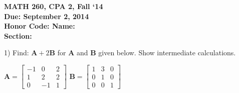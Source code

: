 \documentclass{article}
\begin{document}
\begin{flushleft}
	\bfseries{MATH 260, CPA 2, Fall `14}\\
	\bfseries{Due: September 2, 2014}\\
	\bfseries{Honor Code:} \hspace{3.5in}\bfseries{Name:}\\
	\hspace{4.37in}\bfseries{Section:}
\end{flushleft}
\begin{flushleft}
\vspace{.25in}

1) Find: $\textbf{A} + 2\textbf{B}$ for \textbf{A} and \textbf{B} given below.  Show intermediate calculations.

\vspace{0.2in}

\begin{center}

$\textbf{A}=\left[
\begin{array}{ccc}
-1 & 0 & 2\\
1 & 2 & 2\\
0 & -1 & 1
\end{array}
\right]
$
\hspace{0.1in}
$\textbf{B}=\left[
\begin{array}{ccc}
1 & 3 & 0\\
0 & 1 & 0\\
0 & 0 & 1
\end{array}
\right]
$

\end{center}


\end{flushleft}
\end{document}
